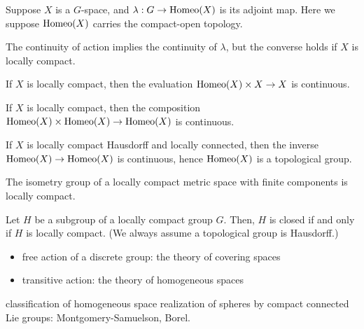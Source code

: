 \documentclass{../../large}
\begin{document}
\begin{prb}
Suppose $X$ is a $G$-space, and $\lambda:G\to\operatorname{Homeo}(X)$ is its adjoint map.
Here we suppose $\operatorname{Homeo}(X)$ carries the compact-open topology.
\begin{parts}
\item The continuity of action implies the continuity of $\lambda$, but the converse holds if $X$ is locally compact.
\item If $X$ is locally compact, then the evaluation $\operatorname{Homeo}(X)\times X\to X$ is continuous.
\item If $X$ is locally compact, then the composition $\operatorname{Homeo}(X)\times\operatorname{Homeo}(X)\to\operatorname{Homeo}(X)$ is continuous.
\item If $X$ is locally compact Hausdorff and locally connected, then the inverse $\operatorname{Homeo}(X)\to\operatorname{Homeo}(X)$ is continuous, hence $\operatorname{Homeo}(X)$ is a topological group.
\end{parts}
\end{prb}


The isometry group of a locally compact metric space with finite components is locally compact.


\begin{prb}
Let $H$ be a subgroup of a locally compact group $G$.
Then, $H$ is closed if and only if $H$ is locally compact.
(We always assume a topological group is Hausdorff.)
\end{prb}

\begin{itemize}
\item free action of a discrete group: the theory of covering spaces
\item transitive action: the theory of homogeneous spaces
\end{itemize}

classification of homogeneous space realization of spheres by compact connected Lie groups: Montgomery-Samuelson, Borel.
\end{document}
